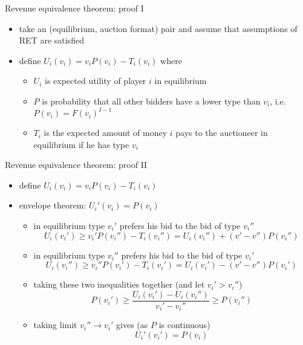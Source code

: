\documentclass[bigger]{beamer}
\begin{document}
\begin{frame}[label={sec:orgf2db9cf}]{Revenue equivalence theorem: proof I}
\begin{itemize}
\item take an (equilibrium, auction format) pair and assume that assumptions of RET are satisfied
\item define \(U_i(v_i)=v_i P(v_i)- T_i(v_i)\) where
\begin{itemize}
\item \(U_i\) is expected utility of player \(i\) in equilibrium
\item \(P\) is probability that all other bidders have a lower type than \(v_i\), i.e. \(P(v_i)=F(v_i)^{I-1}\)
\item \(T_i\) is the expected amount of money \(i\) pays to the auctioneer in equilibrium if he has type \(v_i\)
\end{itemize}
\end{itemize}
\end{frame}
\begin{frame}[label={sec:orgabb4e34}]{Revenue equivalence theorem: proof II}
\begin{itemize}
\item define \(U_i(v_i)=v_i P(v_i)- T_i(v_i)\)
\item \alert{envelope theorem:} \(U_i'(v_i)=P(v_i)\)
\begin{itemize}
\item in equilibrium type \(v_i'\) prefers his bid to the bid of type \(v_i''\)
$$U_i(v_i')\geq v_i' P(v_i'') -T_i(v_i'')=U_i(v_i'')+(v'-v'')P(v_i'')$$
\item in equilibrium type \(v_i''\) prefers his bid to the bid of type \(v_i'\)
$$U_i(v_i'')\geq v_i'' P(v_i') -T_i(v_i')=U_i(v_i')-(v'-v'')P(v_i')$$
\item taking these two inequalities together (and let \(v_i'>v_i''\))
$$P(v_i')\geq \frac{U_i(v_i')-U_i(v_i'')}{v_i'-v_i''}\geq P(v_i'')$$
\item taking limit \(v_i''\rightarrow v_i'\) gives (as \(P\) is continuous)
$$U_i'(v_i')=P(v_i)$$
\end{itemize}
\end{itemize}
\end{frame}
\end{document}
